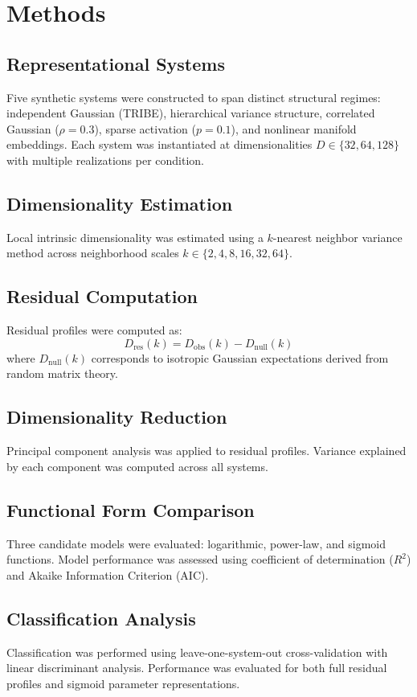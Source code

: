 \documentclass[11pt]{article}
\begin{document}
\section{Methods}

\subsection{Representational Systems}
Five synthetic systems were constructed to span distinct structural regimes: independent Gaussian (TRIBE), hierarchical variance structure, correlated Gaussian ($\rho = 0.3$), sparse activation ($p = 0.1$), and nonlinear manifold embeddings. Each system was instantiated at dimensionalities $D \in \{32, 64, 128\}$ with multiple realizations per condition.

\subsection{Dimensionality Estimation}
Local intrinsic dimensionality was estimated using a $k$-nearest neighbor variance method \citep{levina2005maximum} across neighborhood scales $k \in \{2,4,8,16,32,64\}$.

\subsection{Residual Computation}
Residual profiles were computed as:
\[
	D_{\mathrm{res}}(k) = D_{\mathrm{obs}}(k) - D_{\mathrm{null}}(k)
\]
where $D_{\mathrm{null}}(k)$ corresponds to isotropic Gaussian expectations derived from random matrix theory.

\subsection{Dimensionality Reduction}
Principal component analysis was applied to residual profiles. Variance explained by each component was computed across all systems.

\subsection{Functional Form Comparison}
Three candidate models were evaluated: logarithmic, power-law, and sigmoid functions. Model performance was assessed using coefficient of determination ($R^2$) and Akaike Information Criterion (AIC).

\subsection{Classification Analysis}
Classification was performed using leave-one-system-out cross-validation with linear discriminant analysis. Performance was evaluated for both full residual profiles and sigmoid parameter representations.
\end{document}
